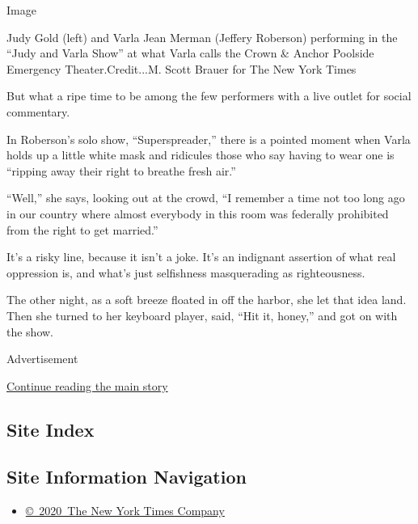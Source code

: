 Image

Judy Gold (left) and Varla Jean Merman (Jeffery Roberson) performing in
the ``Judy and Varla Show'' at what Varla calls the Crown \& Anchor
Poolside Emergency Theater.Credit...M. Scott Brauer for The New York
Times

But what a ripe time to be among the few performers with a live outlet
for social commentary.

In Roberson's solo show, ``Superspreader,'' there is a pointed moment
when Varla holds up a little white mask and ridicules those who say
having to wear one is ``ripping away their right to breathe fresh air.''

``Well,'' she says, looking out at the crowd, ``I remember a time not
too long ago in our country where almost everybody in this room was
federally prohibited from the right to get married.''

It's a risky line, because it isn't a joke. It's an indignant assertion
of what real oppression is, and what's just selfishness masquerading as
righteousness.

The other night, as a soft breeze floated in off the harbor, she let
that idea land. Then she turned to her keyboard player, said, ``Hit it,
honey,'' and got on with the show.

Advertisement

\protect\hyperlink{after-bottom}{Continue reading the main story}

\hypertarget{site-index}{%
\subsection{Site Index}\label{site-index}}

\hypertarget{site-information-navigation}{%
\subsection{Site Information
Navigation}\label{site-information-navigation}}

\begin{itemize}
\tightlist
\item
  \href{https://help.nytimes3xbfgragh.onion/hc/en-us/articles/115014792127-Copyright-notice}{©~2020~The
  New York Times Company}
\end{itemize}

